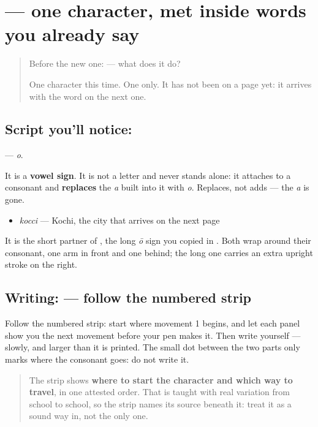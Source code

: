 \section[\texorpdfstring{\ml{ൊ} (o)}{ൊ (o)}]{ — one character, met inside words you already say}

\label{lesson:ML-S143-vowel-sign-o}



\begin{quote}
Before the new one:  — what does it do?

One character this time. One only. It has not been on a page yet: it arrives with the word on the next one.
\end{quote}

\subsection*{Script you'll notice: }
\textbf{} — \emph{o}.

It is a \textbf{vowel sign}. It is not a letter and never stands alone: it attaches to a consonant and \textbf{replaces} the \emph{a} built into it with \emph{o}. Replaces, not adds — the \emph{a} is gone.

\begin{itemize}
\raggedright
  \item \textbf{} \emph{kocci} — Kochi, the city that arrives on the next page
\end{itemize}

It is the short partner of \textbf{}, the long \emph{ō} sign you copied in \textbf{}. Both wrap around their consonant, one arm in front and one behind; the long one carries an extra upright stroke on the right.

\subsection*{Writing:  — follow the numbered strip}

Follow the numbered strip: start where movement 1 begins, and let each panel show you the next movement before your pen makes it. Then write  yourself — slowly, and larger than it is printed. The small dot between the two parts only marks where the consonant goes: do not write it.

\begin{quote}
The strip shows \textbf{where to start the character and which way to travel}, in one attested order. That is taught with real variation from school to school, so the strip names its source beneath it: treat it as a sound way in, not the only one.
\end{quote}

